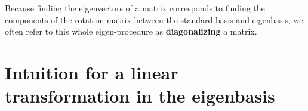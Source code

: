 \documentclass[12pt, oneside]{report}    %
\let\oldsection\section
\def\section{%
  \setcounter{sidenote}{1}%
  \oldsection
}
\begin{document}


\begin{bigidea}
Because finding the eigenvectors of a matrix corresponds to finding the components of the rotation matrix between the standard basis and eigenbasis, we often refer to this whole eigen-procedure as \textbf{diagonalizing} a matrix.
\end{bigidea}



\section{Intuition for a linear transformation in the eigenbasis}
\end{document}

